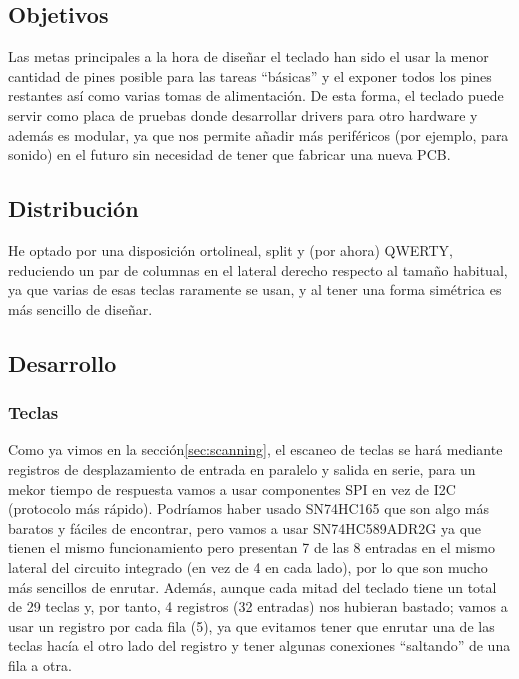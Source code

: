 \subsection{Objetivos}
Las metas principales a la hora de diseñar el teclado han sido el usar la menor cantidad de pines posible para las tareas ``básicas'' y el exponer todos los pines restantes así como varias tomas de alimentación. \newline
De esta forma, el teclado puede servir como placa de pruebas donde desarrollar drivers para otro hardware y además es modular, ya que nos permite añadir más periféricos (por ejemplo, para sonido) en el futuro sin necesidad de tener que fabricar una nueva PCB.

\subsection{Distribución}
He optado por una disposición ortolineal, split y (por ahora) QWERTY, reduciendo un par de columnas en el lateral derecho respecto al tamaño habitual, ya que varias de esas teclas raramente se usan, y al tener una forma simétrica es más sencillo de diseñar. 



\subsection{Desarrollo}
    \subsubsection{Teclas}
    Como ya vimos en la sección\ref{sec:scanning}, el escaneo de teclas se hará mediante registros de desplazamiento de entrada en paralelo y salida en serie, para un mekor tiempo de respuesta vamos a usar   componentes SPI en vez de I2C (protocolo más rápido). 
    Podríamos haber usado SN74HC165 que son algo más baratos y fáciles de encontrar, pero vamos a usar SN74HC589ADR2G ya que tienen el mismo funcionamiento pero presentan 7 de las 8 entradas en el mismo  lateral del circuito integrado (en vez de 4 en cada lado), por lo que son mucho más sencillos de enrutar.
    Además, aunque cada mitad del teclado tiene un total de 29 teclas y, por tanto, 4 registros (32 entradas) nos hubieran bastado; vamos a usar un registro por cada fila (5), ya que evitamos tener que   enrutar una de las teclas hacía el otro lado del registro y tener algunas conexiones ``saltando'' de una fila a otra. \par
    
